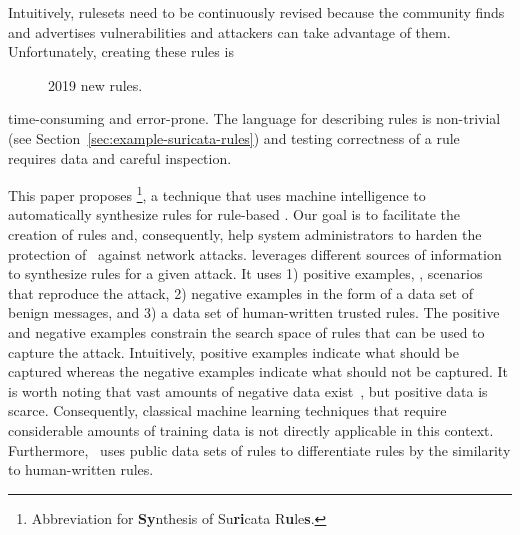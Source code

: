 \documentclass[sigconf,review, anonymous]{acmart}
\begin{document}
Intuitively, rulesets need to be continuously revised because the
community finds and advertises vulnerabilities and attackers can take
advantage of them. Unfortunately, creating these rules is
\begin{figure}
    \vspace{-2ex}  
    \centering
    \vspace{-4ex}
    \caption{\label{fig:distribution-rules-per-month}2019 new rules.}
\end{figure}
time-consuming and error-prone. The language for describing rules is
non-trivial (see Section~\ref{sec:example-suricata-rules}) and testing
correctness of a rule requires data and careful inspection.


This paper proposes \tname{}\footnote{Abbreviation for
  \textbf{Sy}nthesis of Su\textbf{ri}cata R\textbf{u}le\textbf{s}.}, a
technique that uses machine intelligence to automatically synthesize
rules for rule-based \nids. Our goal is to facilitate the creation of
rules and, consequently, help system administrators to harden the
protection of \nids\ against network attacks.  \tname{} leverages
different sources of information to synthesize rules for a given
attack. It uses 1) positive examples, \ie{}, scenarios that reproduce
the attack, 2) negative examples in the form of a data set of benign
messages, and 3) a data set of human-written trusted rules. The
positive and negative examples constrain the search space of rules
that can be used to capture the attack. Intuitively, positive examples
indicate what should be captured whereas the negative examples
indicate what should not be captured. It is worth noting that vast
amounts of negative data exist~\cite{tcpreplay,stratosphere-normal},
but positive data is scarce. Consequently, classical machine learning
techniques that require considerable amounts of training data is not
directly applicable in this context. Furthermore, \tname\ uses public
data sets of rules to differentiate rules by the similarity to
human-written rules.
\end{document}
